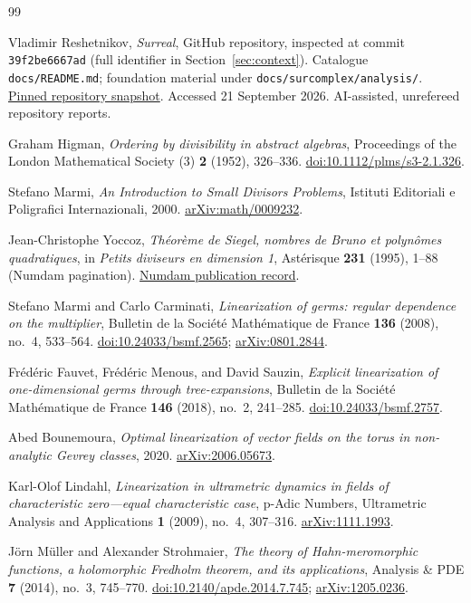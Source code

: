\documentclass[11pt,a4paper]{article}
\numberwithin{equation}{section}
\theoremstyle{definition}
\theoremstyle{remark}
\newcommand{\doi}[1]{\href{https://doi.org/#1}{doi:#1}}
\newcommand{\arxiv}[1]{\href{https://arxiv.org/abs/#1}{arXiv:#1}}
\begin{document}
\begin{thebibliography}{99}

Vladimir Reshetnikov, \emph{Surreal}, GitHub repository, inspected at
commit \texttt{39f2be6667ad} (full identifier in Section~\ref{sec:context}).
Catalogue \texttt{docs/README.md}; foundation material under
\texttt{docs/surcomplex/analysis/}.
\href{https://github.com/VladimirReshetnikov/Surreal/tree/39f2be6667ade51bca2b45daa47e289d69c09764}{Pinned repository snapshot}.
Accessed 21 September 2026. AI-assisted, unrefereed repository reports.

Graham Higman, \emph{Ordering by divisibility in abstract algebras},
Proceedings of the London Mathematical Society (3) \textbf{2} (1952),
326--336. \doi{10.1112/plms/s3-2.1.326}.

Stefano Marmi, \emph{An Introduction to Small Divisors Problems},
Istituti Editoriali e Poligrafici Internazionali, 2000.
\arxiv{math/0009232}.

Jean-Christophe Yoccoz, \emph{Th\'eor\`eme de Siegel, nombres de Bruno et
polyn\^omes quadratiques}, in \emph{Petits diviseurs en dimension 1},
Ast\'erisque \textbf{231} (1995), 1--88 (Numdam pagination).
\href{https://www.numdam.org/item/AST_1995__231__1_0/}{Numdam publication record}.

Stefano Marmi and Carlo Carminati,
\emph{Linearization of germs: regular dependence on the multiplier},
Bulletin de la Soci\'et\'e Math\'ematique de France \textbf{136} (2008),
no.~4, 533--564. \doi{10.24033/bsmf.2565}; \arxiv{0801.2844}.

Fr\'ed\'eric Fauvet, Fr\'ed\'eric Menous, and David Sauzin,
\emph{Explicit linearization of one-dimensional germs through
tree-expansions}, Bulletin de la Soci\'et\'e Math\'ematique de France
\textbf{146} (2018), no.~2, 241--285.
\doi{10.24033/bsmf.2757}.

Abed Bounemoura, \emph{Optimal linearization of vector fields on the torus
in non-analytic Gevrey classes}, 2020. \arxiv{2006.05673}.

Karl-Olof Lindahl, \emph{Linearization in ultrametric dynamics in fields
of characteristic zero---equal characteristic case}, p-Adic Numbers,
Ultrametric Analysis and Applications \textbf{1} (2009), no.~4, 307--316.
\arxiv{1111.1993}.

J\"orn M\"uller and Alexander Strohmaier, \emph{The theory of
Hahn-meromorphic functions, a holomorphic Fredholm theorem, and its
applications}, Analysis \& PDE \textbf{7} (2014), no.~3, 745--770.
\doi{10.2140/apde.2014.7.745}; \arxiv{1205.0236}.

\end{thebibliography}
\end{document}
